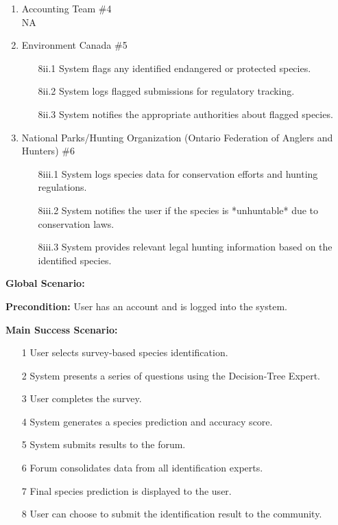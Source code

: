\documentclass[]{article}
\begin{document}
\begin{enumerate}[{\bf BE1.}]
\begin{enumerate}[{\bf VP1.}]
    \item Accounting Team \#4 \\
    \newline NA

    \item Environment Canada \#5 \\
    \begin{enumerate}
        \item[8ii.1] System flags any identified endangered or protected species.
        \item[8ii.2] System logs flagged submissions for regulatory tracking.
        \item[8ii.3] System notifies the appropriate authorities about flagged species.
    \end{enumerate}

    \item National Parks/Hunting Organization (Ontario Federation of Anglers and Hunters) \#6 \\
    \begin{enumerate}
        \item [8iii.1] System logs species data for conservation efforts and hunting regulations.
        \item [8iii.2] System notifies the user if the species is *unhuntable* due to conservation laws.
        \item [8iii.3] System provides relevant legal hunting information based on the identified species.
    \end{enumerate}
\end{enumerate}

\textbf{Global Scenario:}

\textbf{Precondition:} User has an account and is logged into the system.

\textbf{Main Success Scenario:}
\begin{enumerate}
    \item[1] User selects survey-based species identification.
    \item[2] System presents a series of questions using the Decision-Tree Expert.
    \item[3] User completes the survey.
    \item[4] System generates a species prediction and accuracy score.
    \item[5] System submits results to the forum.
    \item[6] Forum consolidates data from all identification experts.
    \item[7] Final species prediction is displayed to the user.
    \item[8] User can choose to submit the identification result to the community.
\end{enumerate}


\end{enumerate}
\end{document}
